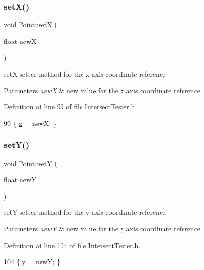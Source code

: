 \subsubsection{\texorpdfstring{set\+X()}{setX()}}
{\footnotesize\ttfamily void Point\+::setX (\begin{DoxyParamCaption}\item[{float}]{newX }\end{DoxyParamCaption})\hspace{0.3cm}{\ttfamily [inline]}}



setX setter method for the x axis coordinate reference 


\begin{DoxyParams}{Parameters}
{\em newX} & new value for the x axis coordinate reference \\
\hline
\end{DoxyParams}


Definition at line 99 of file Intersect\+Tester.\+h.


\begin{DoxyCode}
99 \{ \hyperlink{class_point_a05dfe2dfbde813ad234b514f30e662f1}{x} = newX; \}
\end{DoxyCode}
\mbox{\label{class_point_ad77207403cf0e51641b7bc500d351e3f}} 
\subsubsection{\texorpdfstring{set\+Y()}{setY()}}
{\footnotesize\ttfamily void Point\+::setY (\begin{DoxyParamCaption}\item[{float}]{newY }\end{DoxyParamCaption})\hspace{0.3cm}{\ttfamily [inline]}}



setY setter method for the y axis coordinate reference 


\begin{DoxyParams}{Parameters}
{\em newY} & new value for the y axis coordinate reference \\
\hline
\end{DoxyParams}


Definition at line 104 of file Intersect\+Tester.\+h.


\begin{DoxyCode}
104 \{ \hyperlink{class_point_a6101960c8d2d4e8ea1d32c9234bbeb8d}{y} = newY; \}
\end{DoxyCode}
\mbox{\label{class_point_a82621ca550dece2b002d8fb5d7b17221}} 
